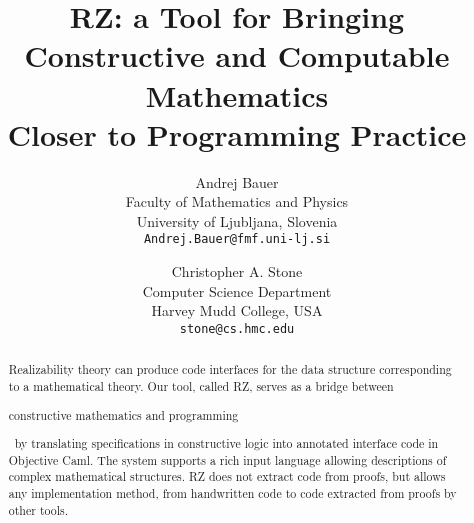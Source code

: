 \documentclass{article}
\newif\iflong
\begin{document}
\title{RZ: a Tool for Bringing\\
  Constructive and Computable Mathematics\\
  Closer to Programming Practice}
\author{
  Andrej Bauer\\
  Faculty of Mathematics and Physics\\
  University of Ljubljana, Slovenia\\
  \texttt{Andrej.Bauer@fmf.uni-lj.si}
\and
  Christopher A. Stone\\
  Computer Science Department\\
  Harvey Mudd College, USA\\
  \texttt{stone@cs.hmc.edu}
}

\maketitle

\begin{abstract}
  Realizability theory 
\iflong 
  is not just a fundamental tool in logic
  and computability.  It also 
  has direct application to the design and
  implementation of programs, since it
\fi %
  can produce code interfaces for the data
  structure corresponding to a
  mathematical theory.
%
  Our tool, called RZ,
  serves as a bridge between
\iflong the worlds of \fi
  constructive
  mathematics and programming%
\iflong 
.
By using the realizability
  interpretation of constructive mathematics, RZ 
  translates
\else
\ by translating
\fi %
  specifications in constructive logic into annotated
  interface code in Objective Caml.
%
  The system supports
  a rich input language allowing descriptions of
  complex mathematical structures. RZ does not extract code from
  proofs, but allows any implementation method, from handwritten code to code extracted from
  proofs by other tools.
\end{abstract}

\iffalse
\begin{center}
  Version of \today.
\end{center}
\fi













\iflong
\appendix

\fi %
\end{document}
